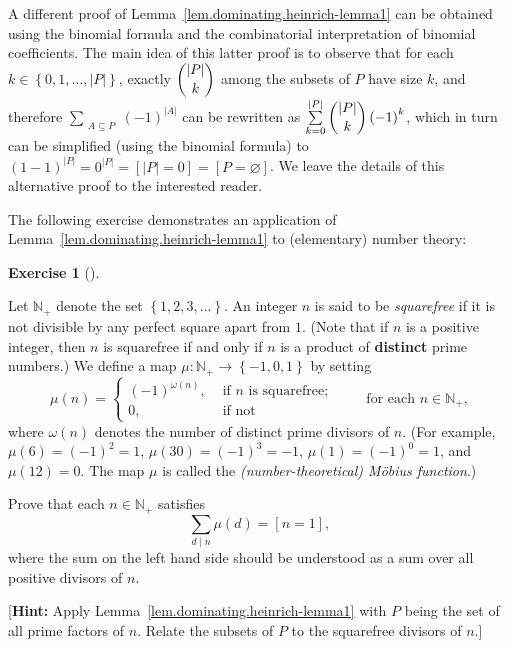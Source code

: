 \documentclass[numbers=enddot,12pt,final,onecolumn,notitlepage]{scrartcl}%
\theoremstyle{definition}
\newtheorem{exmp}[theo]{Exercise}
\newenvironment{exercise}[1][]
{\begin{exmp}[#1]\begin{leftbar}}
{\end{leftbar}\end{exmp}}
\let\sumnonlimits\sum
\renewcommand{\sum}{\sumnonlimits\limits}
\newcommand{\NN}{\mathbb{N}}
\newcommand{\set}[1]{\left\{ #1 \right\}}
\newcommand{\abs}[1]{\left| #1 \right|}
\newcommand{\tup}[1]{\left( #1 \right)}
\newcommand{\ive}[1]{\left[ #1 \right]}
\begin{document}
A different proof of Lemma~\ref{lem.dominating.heinrich-lemma1} can
be obtained using the binomial formula and the combinatorial
interpretation of binomial coefficients. The main idea of this latter
proof is to observe that for each $k \in \set{0,1,\ldots,\abs{P}}$,
exactly $\dbinom{\abs{P}}{k}$ among the subsets of $P$ have size $k$,
and therefore
$\sum_{\substack{A \subseteq P}} \tup{-1}^{\abs{A}}$ can be rewritten
as $\sum_{k=0}^{\abs{P}} \dbinom{\abs{P}}{k} \tup{-1}^k$, which in
turn can be simplified (using the binomial formula) to
$\tup{1-1}^{\abs{P}} = 0^{\abs{P}} = \ive{\abs{P} = 0}
= \ive{P = \varnothing}$. We leave the details of this alternative
proof to the interested reader.

The following exercise demonstrates an application of
Lemma~\ref{lem.dominating.heinrich-lemma1} to (elementary) number
theory:

\begin{exercise} \label{exe.dominating.heinrich-lemma-moeb-NT}
Let $\NN_+$ denote the set $\set{1, 2, 3, \ldots}$. An integer $n$ is
said to be \textit{squarefree} if it is not divisible by any perfect
square apart from $1$. (Note that if $n$ is a positive integer, then
$n$ is squarefree if and only if $n$ is a product of
\textbf{distinct} prime numbers.) We define a map
$\mu : \NN_+ \to \set{-1, 0, 1}$ by setting
\[
\mu\tup{n}
= \begin{cases}
\tup{-1}^{\omega\tup{n}}, & \text{ if } n \text{ is squarefree;} \\
0,                        & \text{ if not }
\end{cases}
\qquad \text{ for each } n \in \NN_+ ,
\]
where $\omega\tup{n}$ denotes the number of distinct prime divisors
of $n$. (For example, $\mu\tup{6} = \tup{-1}^2 = 1$,
$\mu\tup{30} = \tup{-1}^3 = -1$,
$\mu\tup{1} = \tup{-1}^0 = 1$, and $\mu\tup{12} = 0$. The map $\mu$
is called the \textit{(number-theoretical) M\"obius function}.)

Prove that each $n \in \NN_+$ satisfies
\[
\sum_{d\mid n} \mu\tup{d} = \ive{n = 1},
\]
where the sum on the left hand side should be understood as a sum over
all positive divisors of $n$.

[\textbf{Hint:} Apply Lemma~\ref{lem.dominating.heinrich-lemma1} with
$P$ being the set of all prime factors of $n$. Relate the subsets of
$P$ to the squarefree divisors of $n$.]
\end{exercise}
\end{document}
